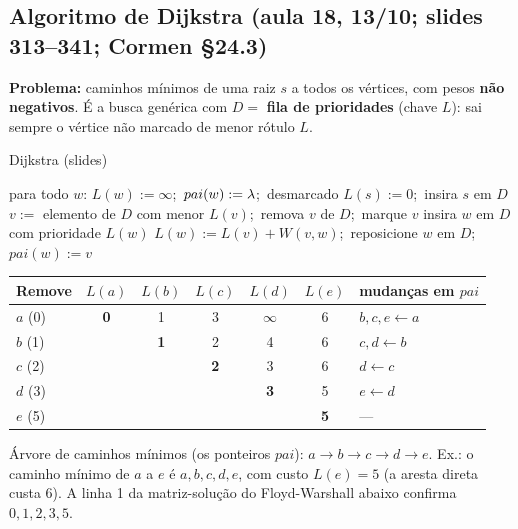 \subsection{Algoritmo de Dijkstra (aula 18, 13/10; slides 313--341; Cormen §24.3)}\label{sec:dijkstra}
\textbf{Problema:} caminhos mínimos de uma raiz $s$ a todos os vértices, com pesos \textbf{não negativos}. É a busca genérica com $D=$ \textbf{fila de prioridades} (chave $L$): sai sempre o vértice não marcado de menor rótulo $L$.
\begin{pseudo}{Dijkstra (slides)}
\begin{algorithmic}
  \State para todo $w$: $L(w):=\infty$;\ $pai(w):=\lambda$;\ desmarcado
  \State $L(s):=0$;\ insira $s$ em $D$
    \State $v:=$ elemento de $D$ com menor $L(v)$;\ remova $v$ de $D$;\ marque $v$ 
       \State insira $w$ em $D$ com prioridade $L(w)$ \EndIf
       
        \State $L(w):=L(v)+W(v,w)$;\ reposicione $w$ em $D$;\ $pai(w):=v$
      \EndIf
    \EndFor
  \EndWhile
\EndProcedure
\end{algorithmic}
\end{pseudo}
\begin{exemplo}\leavevmode
\begin{center}\small
\begin{tabular}{l|ccccc|l}
Remove & $L(a)$ & $L(b)$ & $L(c)$ & $L(d)$ & $L(e)$ & mudanças em $pai$\\ \hline
$a$ (0) & \textbf{0} & 1 & 3 & $\infty$ & 6 & $b,c,e\leftarrow a$\\
$b$ (1) & & \textbf{1} & 2 & 4 & 6 & $c,d\leftarrow b$\\
$c$ (2) & & & \textbf{2} & 3 & 6 & $d\leftarrow c$\\
$d$ (3) & & & & \textbf{3} & 5 & $e\leftarrow d$\\
$e$ (5) & & & & & \textbf{5} & ---
\end{tabular}
\end{center}
Árvore de caminhos mínimos (os ponteiros $pai$): $a\to b\to c\to d\to e$. Ex.: o caminho mínimo de $a$ a $e$ é $a,b,c,d,e$, com custo $L(e)=5$ (a aresta direta custa 6). A linha 1 da matriz-solução do Floyd-Warshall abaixo confirma $0,1,2,3,5$.
\end{exemplo}

